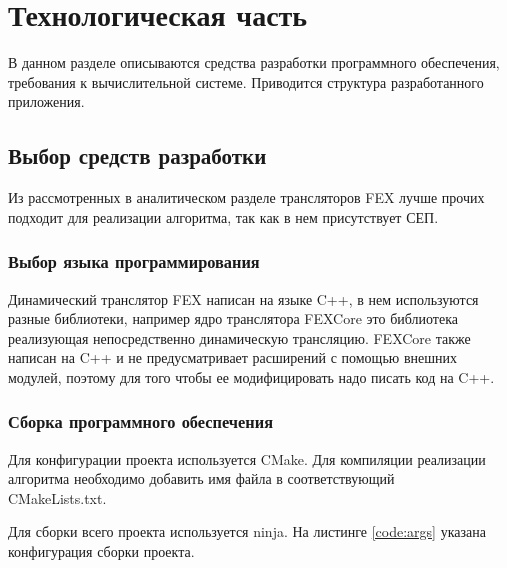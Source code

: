 \section{Технологическая часть}

В данном разделе описываются средства разработки программного обеспечения, требования к вычислительной системе. Приводится структура разработанного приложения.

\subsection{Выбор средств разработки}

Из рассмотренных в аналитическом разделе трансляторов FEX лучше прочих подходит для реализации алгоритма, так как в нем присутствует СЕП.

\subsubsection{Выбор языка программирования}

Динамический транслятор FEX написан на языке C++, в нем используются разные библиотеки, например ядро транслятора FEXCore это библиотека реализующая непосредственно динамическую трансляцию. FEXCore также написан на C++ и не предусматривает расширений с помощью внешних модулей, поэтому для того чтобы ее модифицировать надо писать код на C++.

\subsubsection{Сборка программного обеспечения}

Для конфигурации проекта используется CMake. \cite{cmake} Для компиляции реализации алгоритма необходимо добавить имя файла в соответствующий \\ CMakeLists.txt.

Для сборки всего проекта используется ninja. \cite{ninja} На листинге \ref{code:args} указана конфигурация сборки проекта.


